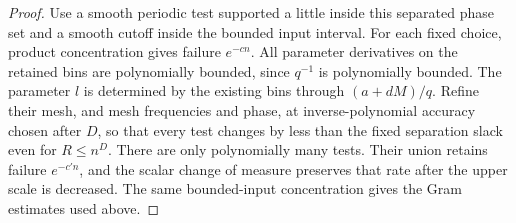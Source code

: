 \begin{proof}
Use a smooth periodic test supported a little inside this separated
phase set and a smooth cutoff inside the bounded input interval.
For each fixed choice, product concentration gives failure $e^{-cn}$.
All parameter derivatives on the retained bins are polynomially
bounded, since $q^{-1}$ is polynomially bounded. The parameter $l$
is determined by the existing bins through $(a+dM)/q$. Refine their
mesh, and mesh frequencies and phase, at inverse-polynomial accuracy
chosen after $D$, so that every test changes by less than the fixed
separation slack even for $R\le n^D$. There are only polynomially
many tests. Their union retains failure $e^{-c'n}$, and the scalar
change of measure preserves that rate after the upper scale is
decreased. The same bounded-input concentration gives the Gram
estimates used above.
\end{proof}
